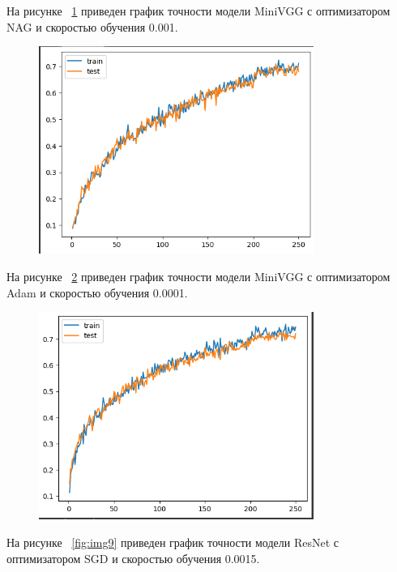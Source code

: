 \documentclass[a4paper, 14pt]{extarticle}
\begin{document}
На рисунке ~\ref{fig:img7} приведен график точности модели MiniVGG с оптимизатором NAG и скоростью обучения 0.001.

\begin{figure}[H]
\centering
\includegraphics[width=0.8\textwidth]{images/res7.png}
\caption{}
\label{fig:img7}
\end{figure}

На рисунке ~\ref{fig:img8} приведен график точности модели MiniVGG с оптимизатором Adam и скоростью обучения 0.0001.

\begin{figure}[H]
\centering
\includegraphics[width=0.8\textwidth]{images/res8.png}
\caption{}
\label{fig:img8}
\end{figure}


На рисунке ~\ref{fig:img9} приведен график точности модели ResNet с оптимизатором SGD и скоростью обучения 0.0015.
\end{document}
